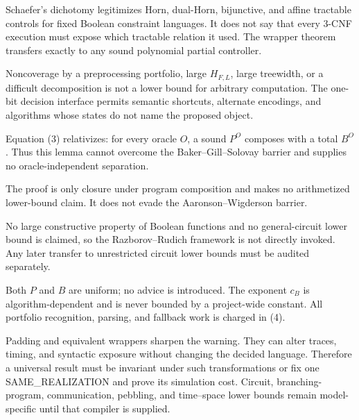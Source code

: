 \documentclass[11pt]{article}
\begin{document}
\begin{description}[leftmargin=3.4cm,style=nextline]
\item[THEOREM TRANSFER.]
Schaefer's dichotomy legitimizes Horn, dual-Horn, bijunctive, and affine
tractable controls for fixed Boolean constraint languages.  It does not say
that every 3-CNF execution must expose which tractable relation it used.
The wrapper theorem transfers exactly to any sound polynomial partial
controller.

\item[FAILED TRANSFER.]
Noncoverage by a preprocessing portfolio, large $H_{F,L}$, large treewidth,
or a difficult decomposition is not a lower bound for arbitrary computation.
The one-bit decision interface permits semantic shortcuts, alternate
encodings, and algorithms whose states do not name the proposed object.

\item[RELATIVIZATION.]
Equation (3) relativizes: for every oracle $O$, a sound $P^O$ composes with a
total $B^O$.  Thus this lemma cannot overcome the Baker--Gill--Solovay barrier
and supplies no oracle-independent separation.

\item[ALGEBRIZATION.]
The proof is only closure under program composition and makes no arithmetized
lower-bound claim.  It does not evade the Aaronson--Wigderson barrier.

\item[NATURAL PROOFS.]
No large constructive property of Boolean functions and no general-circuit
lower bound is claimed, so the Razborov--Rudich framework is not directly
invoked.  Any later transfer to unrestricted circuit lower bounds must be
audited separately.

\item[NONUNIFORMITY AND EXPONENTS.]
Both $P$ and $B$ are uniform; no advice is introduced.  The exponent $c_B$ is
algorithm-dependent and is never bounded by a project-wide constant.  All
portfolio recognition, parsing, and fallback work is charged in (4).
\end{description}

Padding and equivalent wrappers sharpen the warning.  They can alter traces,
timing, and syntactic exposure without changing the decided language.
Therefore a universal result must be invariant under such transformations or
fix one SAME\_REALIZATION and prove its simulation cost.  Circuit, branching-
program, communication, pebbling, and time--space lower bounds remain
model-specific until that compiler is supplied.
\end{document}
